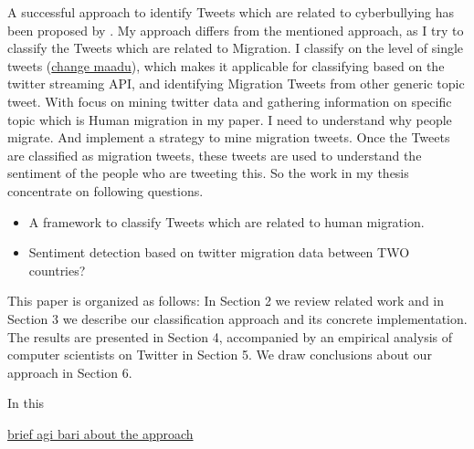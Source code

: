 A successful approach to identify Tweets which are related to cyberbullying has been proposed by \cite{Cortis}. My approach differs from the mentioned approach, as I try to classify the Tweets which are related to Migration. I classify on the level of single tweets (\underline{change maadu}), which makes it applicable for classifying based on the twitter streaming API, and identifying Migration Tweets from other generic topic tweet. With focus on mining twitter data and gathering information on specific topic which is Human migration in my paper. I need to understand why people migrate. And implement a strategy to mine migration tweets. Once the Tweets are classified as migration tweets, these tweets are used to understand the sentiment of the people who are tweeting this. So the work in my thesis concentrate on following questions. 

\begin{itemize}
  \item A framework to classify Tweets which are related to human migration.
  \item Sentiment detection based on twitter migration data between TWO countries? 
\end{itemize}

This paper is organized as follows: In Section 2 we review
related work and in Section 3 we describe our classification
approach and its concrete implementation. The results are
presented in Section 4, accompanied by an empirical analysis of computer scientists on Twitter in Section 5. We draw
conclusions about our approach in Section 6.


In this 


\underline{brief agi bari about the approach}


